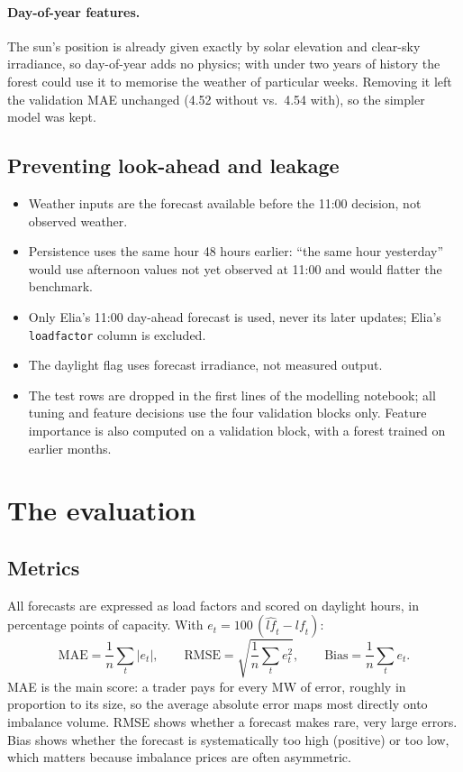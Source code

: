 \documentclass[11pt,a4paper]{article}
\newcommand{\lf}{\ensuremath{\mathit{lf}}}
\begin{document}
\paragraph{Day-of-year features.} The sun's position is already given exactly by solar elevation
and clear-sky irradiance, so day-of-year adds no physics; with under two years of history the
forest could use it to memorise the weather of particular weeks. Removing it left the validation MAE
unchanged (4.52 without vs.\ 4.54 with), so the simpler model was kept.

\subsection{Preventing look-ahead and leakage}

\begin{itemize}
  \item Weather inputs are the forecast available before the 11:00 decision, not observed weather.
  \item Persistence uses the same hour 48 hours earlier: ``the same hour yesterday'' would use
  afternoon values not yet observed at 11:00 and would flatter the benchmark.
  \item Only Elia's 11:00 day-ahead forecast is used, never its later updates; Elia's
  \texttt{loadfactor} column is excluded.
  \item The daylight flag uses forecast irradiance, not measured output.
  \item The test rows are dropped in the first lines of the modelling notebook; all tuning and
  feature decisions use the four validation blocks only. Feature importance is also computed on a
  validation block, with a forest trained on earlier months.
\end{itemize}

\section{The evaluation}
\label{sec:evaluation}

\subsection{Metrics}

All forecasts are expressed as load factors and scored on daylight hours, in percentage points of
capacity. With $e_t = 100\,(\widehat{\lf}_t - \lf_t)$:
\[
  \text{MAE} = \frac{1}{n}\sum_t |e_t|, \qquad
  \text{RMSE} = \sqrt{\frac{1}{n}\sum_t e_t^2}, \qquad
  \text{Bias} = \frac{1}{n}\sum_t e_t .
\]
MAE is the main score: a trader pays for every MW of error, roughly in proportion to its size, so
the average absolute error maps most directly onto imbalance volume. RMSE shows whether a forecast
makes rare, very large errors. Bias shows whether the forecast is systematically too high (positive)
or too low, which matters because imbalance prices are often asymmetric.
\end{document}
